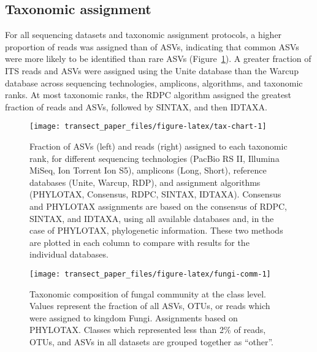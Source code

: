 \documentclass[
  12pt,
]{article}
\begin{document}
\hypertarget{taxonomic-assignment}{%
\subsection{Taxonomic assignment}\label{taxonomic-assignment}}

For all sequencing datasets and taxonomic assignment protocols, a higher proportion of reads was assigned than of ASVs, indicating that common ASVs were more likely to be identified than rare ASVs (Figure~\ref{fig:tax-chart}).
A greater fraction of ITS reads and ASVs were assigned using the Unite database than the Warcup database across sequencing technologies, amplicons, algorithms, and taxonomic ranks.
At most taxonomic ranks, the RDPC algorithm assigned the greatest fraction of reads and ASVs, followed by SINTAX, and then IDTAXA.







\begin{figure}

{\centering \texttt{[image: transect\_paper\_files/figure-latex/tax-chart-1]} 

}

\caption[Summary of taxonomic assignments]{Fraction of ASVs (left) and reads (right) assigned to each taxonomic rank, for different sequencing technologies (PacBio RS II, Illumina MiSeq, Ion Torrent Ion S5), amplicons (Long, Short), reference databases (Unite, Warcup, RDP), and assignment algorithms (PHYLOTAX, Consensus, RDPC, SINTAX, IDTAXA).
Consensus and PHYLOTAX assignments are based on the consensus of RDPC, SINTAX, and IDTAXA, using all available databases and, in the case of PHYLOTAX, phylogenetic information.
These two methods are plotted in each column to compare with results for the individual databases.}\label{fig:tax-chart}
\end{figure}







\begin{figure}

{\centering \texttt{[image: transect\_paper\_files/figure-latex/fungi-comm-1]} 

}

\caption[Taxonomic composition of fungal community at the class level]{Taxonomic composition of fungal community at the class level. Values represent the fraction of all ASVs, OTUs, or reads which were assigned to kingdom Fungi.
Assignments based on PHYLOTAX.
Classes which represented less than 2\% of reads, OTUs, and ASVs in all datasets are grouped together as ``other''.}\label{fig:fungi-comm}
\end{figure}
\end{document}
